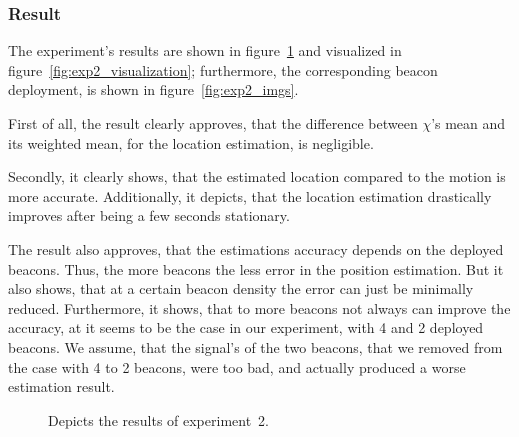 \subsubsection*{Result}
The experiment's results are shown in figure~\ref{fig:exp2_results} and visualized in figure~\ref{fig:exp2_visualization}; furthermore, the corresponding beacon deployment, is shown in figure~\ref{fig:exp2_imgs}.

First of all, the result clearly approves, that the difference between $\chi$'s mean and its weighted mean, for the location estimation, is negligible.

Secondly, it clearly shows, that the estimated location compared to the motion is more accurate. Additionally, it depicts, that the location estimation drastically improves after being a few seconds stationary.

The result also approves, that the estimations accuracy depends on the deployed beacons. Thus, the more beacons the less error in the position estimation. But it also shows, that at a certain beacon density the error can just be minimally reduced. Furthermore, it shows, that to more beacons not always can improve the accuracy, at it seems to be the case in our experiment, with 4 and 2 deployed beacons. We assume, that the signal's of the two beacons, that we removed from the case with 4 to 2 beacons, were too bad, and actually produced a worse estimation result.

\begin{figure}

\caption{Depicts the results of experiment~2.}
\label{fig:exp2_results}
\end{figure}

